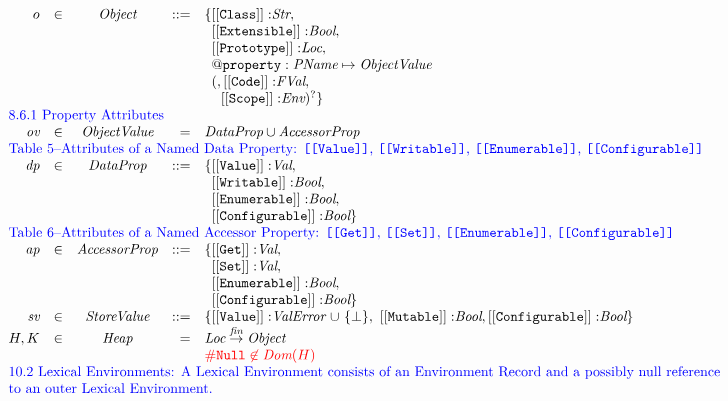 \documentclass[a4paper, leqno]{amsart}
\def\inred{\color{red}}
\def\inblue{\color{blue}}
\newcommand{\nullL}{{\tt \#Null}}
\newcommand{\sv}{\emph{StoreValue}}
\newcommand{\Bool}{\emph{Bool}}
\newcommand{\ve}{\emph{ValError}}
\newcommand{\pname}{\emph{PName}}
\newcommand{\Val}{\emph{Val}}
\newcommand{\FVal}{\emph{FVal}}
\newcommand{\Loc}{\emph{Loc}}
\newcommand{\Obj}{\emph{Object}}
\newcommand{\ObjV}{\emph{ObjectValue}}
\newcommand{\Str}{\emph{Str}}
\newcommand{\Heap}{\emph{Heap}}
\newcommand{\Env}{\emph{Env}}
\newcommand{\finto}{\stackrel{\tiny \emph{fin}}{\rightarrow}}
\newcommand{\hf}[1]{\emph{#1}}
\def\inred{\color{red}}
\def\inblue{\color{blue}}
\begin{document}
\[\begin{array}{rlcrll}
o & \in & \Obj & ::= &
 {\tt \{[[Class]]:} \Str,\\
&&&& \phantom{\{}{\tt [[Extensible]]:} \Bool,& \\
&&&& \phantom{\{}{\tt [[Prototype]]:} \Loc,& \\
&&&& \phantom{\{}{\tt @property: \pname\mapsto\ObjV}& \\
&&&& \phantom{\{}(,{\tt [[Code]]:} \FVal,\\
&&&& \phantom{\{(,}{\tt [[Scope]]:} \Env)^?\} & \\
%
%
\multicolumn{6}{l}{\mbox{\inblue 8.6.1 Property Attributes}}\\
\emph{ov} & \in & \ObjV & = & \emph{DataProp} \cup \emph{AccessorProp}\\

\multicolumn{6}{l}{\mbox{\inblue Table 5--Attributes of a Named Data Property:
{\tt [[Value]]}, {\tt [[Writable]]}, {\tt [[Enumerable]]}, {\tt [[Configurable]]}}}\\
\emph{dp} & \in & \emph{DataProp} & ::= &
 \{{\tt [[Value]]:} \Val ,\\
&&&& \phantom{\{}{\tt [[Writable]]:} \Bool,& \\
&&&& \phantom{\{}{\tt [[Enumerable]]:} \Bool,& \\
&&&& \phantom{\{}{\tt [[Configurable]]:} \Bool\}& \\

\multicolumn{6}{l}{\mbox{\inblue Table 6--Attributes of a Named Accessor Property:
{\tt [[Get]]}, {\tt [[Set]]}, {\tt [[Enumerable]]}, {\tt [[Configurable]]}}}\\
\emph{ap} & \in & \emph{AccessorProp} & ::= &
 \{{\tt [[Get]]:} \Val ,\\
&&&& \phantom{\{}{\tt [[Set]]:} \Val,& \\
&&&& \phantom{\{}{\tt [[Enumerable]]:} \Bool,& \\
&&&& \phantom{\{}{\tt [[Configurable]]:} \Bool\}& \\

\emph{sv}&\in&\sv & ::= &
\{{\tt [[Value]]:}\ve\
{\cup\ \{\bot\}},\
{\tt [[Mutable]]:}\Bool,
{\tt [[Configurable]]:}\Bool\}\\

H, K & \in & \Heap & = & \Loc \finto \Obj\\
&&&&\mbox{\inred $\nullL\not\in\hf{Dom}(H)$}\\

\multicolumn{6}{l}{\inblue
\mbox{10.2 Lexical Environments:
A Lexical Environment consists of an Environment Record and a possibly null reference}}\\
\multicolumn{6}{l}{\inblue
\mbox{to an outer Lexical Environment.}}\\


\end{array}\]
\end{document}
